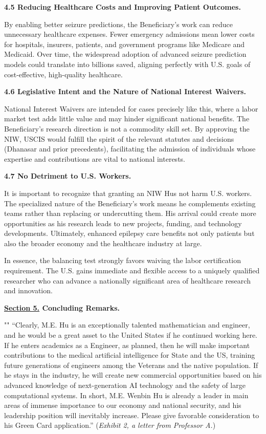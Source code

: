 \documentclass{article}
\begin{document}
{\bf 4.5 Reducing Healthcare Costs and Improving Patient Outcomes.}

By enabling better seizure predictions, the Beneficiary’s work can reduce unnecessary healthcare expenses. Fewer emergency admissions mean lower costs for hospitals, insurers, patients, and government programs like Medicare and Medicaid. Over time, the widespread adoption of advanced seizure prediction models could translate into billions saved, aligning perfectly with U.S. goals of cost-effective, high-quality healthcare.


{\bf 4.6 Legislative Intent and the Nature of National Interest Waivers.}

National Interest Waivers are intended for cases precisely like this, where a labor market test adds little value and may hinder significant national benefits. The Beneficiary’s research direction is not a commodity skill set. By approving the NIW, USCIS would fulfill the spirit of the relevant statutes and decisions (Dhanasar and prior precedents), facilitating the admission of individuals whose expertise and contributions are vital to national interests.

{\bf 4.7 No Detriment to U.S. Workers.}

It is important to recognize that granting an NIW Hus not harm U.S. workers. The specialized nature of the Beneficiary’s work means he complements existing teams rather than replacing or undercutting them. His arrival could create more opportunities as his research leads to new projects, funding, and technology developments. Ultimately, enhanced epilepsy care benefits not only patients but also the broader economy and the healthcare industry at large.

In essence, the balancing test strongly favors waiving the labor certification requirement. The U.S. gains immediate and flexible access to a uniquely qualified researcher who can advance a nationally significant area of healthcare research and innovation.

\clearpage

{\bf \underline{Section 5.} Concluding Remarks. }

""
“Clearly, M.E. Hu is an exceptionally talented mathematician and engineer, and he would be a great asset to the United States if he continued working here. If he enters academics as a Engineer, as planned, then he will make important contributions to the medical artificial intelligence for State and the US, training future generations of engineers among the Veterans and the native population. If he stays in the industry, he will create new commercial opportunities based on his advanced knowledge of next-generation AI technology and the safety of large computational systems. In short, M.E. Wenbin Hu is already a leader in main areas of immense importance to our economy and national security, and his leadership position will inevitably increase. Please give favorable consideration to his Green Card application.” ({\it Exhibit 2, a letter from Professor A.}) 
\end{document}
